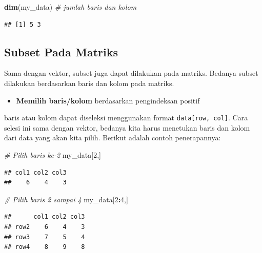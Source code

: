 \documentclass[]{book}
\newenvironment{Shaded}{\begin{snugshade}}{\end{snugshade}}
\newcommand{\CommentTok}[1]{\textcolor[rgb]{0.56,0.35,0.01}{\textit{#1}}}
\newcommand{\DecValTok}[1]{\textcolor[rgb]{0.00,0.00,0.81}{#1}}
\newcommand{\KeywordTok}[1]{\textcolor[rgb]{0.13,0.29,0.53}{\textbf{#1}}}
\newcommand{\NormalTok}[1]{#1}
\newcommand{\OperatorTok}[1]{\textcolor[rgb]{0.81,0.36,0.00}{\textbf{#1}}}
\providecommand{\tightlist}{%
  \setlength{\itemsep}{0pt}\setlength{\parskip}{0pt}}
\theoremstyle{definition}
\theoremstyle{definition}
\theoremstyle{definition}
\theoremstyle{remark}
\begin{document}
\begin{Shaded}
\begin{Highlighting}[]
\KeywordTok{dim}\NormalTok{(my_data) }\CommentTok{# jumlah baris dan kolom}
\end{Highlighting}
\end{Shaded}

\begin{verbatim}
## [1] 5 3
\end{verbatim}

\hypertarget{subsetmatrix}{%
\subsection{Subset Pada Matriks}\label{subsetmatrix}}

Sama dengan vektor, subset juga dapat dilakukan pada matriks. Bedanya subset dilakukan berdasarkan baris dan kolom pada matriks.

\begin{itemize}
\tightlist
\item
  \textbf{Memilih baris/kolom} berdasarkan pengindeksan positif
\end{itemize}

baris atau kolom dapat diseleksi menggunakan format \texttt{data{[}row,\ col{]}}. Cara selesi ini sama dengan vektor, bedanya kita harus menetukan baris dan kolom dari data yang akan kita pilih. Berikut adalah contoh penerapannya:

\begin{Shaded}
\begin{Highlighting}[]
\CommentTok{# Pilih baris ke-2}
\NormalTok{my_data[}\DecValTok{2}\NormalTok{,]}
\end{Highlighting}
\end{Shaded}

\begin{verbatim}
## col1 col2 col3 
##    6    4    3
\end{verbatim}

\begin{Shaded}
\begin{Highlighting}[]
\CommentTok{# Pilih baris 2 sampai 4}
\NormalTok{my_data[}\DecValTok{2}\OperatorTok{:}\DecValTok{4}\NormalTok{,]}
\end{Highlighting}
\end{Shaded}

\begin{verbatim}
##      col1 col2 col3
## row2    6    4    3
## row3    7    5    4
## row4    8    9    8
\end{verbatim}
\end{document}
